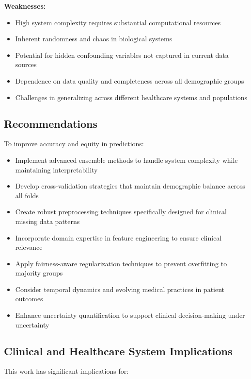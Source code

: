 \textbf{Weaknesses:}

\begin{itemize}
    \item High system complexity requires substantial computational resources
    \item Inherent randomness and chaos in biological systems \cite{biorxiv_autoimmune}
    \item Potential for hidden confounding variables not captured in current data sources
    \item Dependence on data quality and completeness across all demographic groups
    \item Challenges in generalizing across different healthcare systems and populations
\end{itemize}

\subsection{Recommendations}

To improve accuracy and equity in predictions:

\begin{itemize}
    \item Implement advanced ensemble methods to handle system complexity while maintaining interpretability \cite{frontiers_ai_hct}
    \item Develop cross-validation strategies that maintain demographic balance across all folds
    \item Create robust preprocessing techniques specifically designed for clinical missing data patterns
    \item Incorporate domain expertise in feature engineering to ensure clinical relevance
    \item Apply fairness-aware regularization techniques to prevent overfitting to majority groups
    \item Consider temporal dynamics and evolving medical practices in patient outcomes \cite{stmcls_clonality}
    \item Enhance uncertainty quantification to support clinical decision-making under uncertainty
\end{itemize}

\subsection{Clinical and Healthcare System Implications}

This work has significant implications for:

